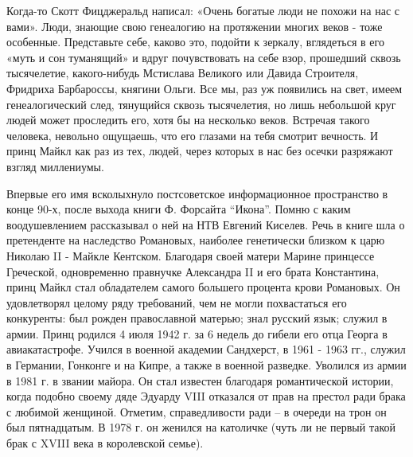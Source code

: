 \raggedcolumns
\begin{multicols}{2} %
\setlength{\parindent}{0pt}



\end{multicols} %

Когда-то Скотт Фицджеральд написал:  «Очень богатые люди не похожи на нас с
вами». Люди, знающие свою генеалогию на протяжении многих веков - тоже
особенные. Представьте себе, каково это, подойти к зеркалу, вглядеться в его
«муть и сон туманящий» и вдруг почувствовать на себе взор, прошедший сквозь
тысячелетие, какого-нибудь Мстислава Великого или Давида Строителя, Фридриха
Барбароссы, княгини Ольги. Все мы, раз уж появились на свет, имеем
генеалогический след, тянущийся сквозь тысячелетия, но лишь небольшой круг
людей может проследить его, хотя бы на несколько веков. Встречая такого
человека, невольно ощущаешь, что его глазами на тебя смотрит вечность. И принц
Майкл как раз из тех, людей, через которых в нас без осечки разряжают взгляд
миллениумы.

Впервые его имя всколыхнуло постсоветское информационное пространство в конце
90-х, после выхода книги Ф. Форсайта \enquote{Икона}. Помню с каким воодушевлением
рассказывал о ней на НТВ Евгений Киселев. Речь в книге шла о претенденте на
наследство Романовых, наиболее генетически близком к царю Николаю II - Майкле
Кентском. Благодаря своей матери Марине принцессе Греческой, одновременно
правнучке Александра II и его брата Константина, принц Майкл стал обладателем
самого большего процента крови Романовых. Он удовлетворял целому ряду
требований, чем не могли похвастаться его конкуренты: был рожден православной
матерью; знал русский язык; служил в армии. Принц родился 4 июля 1942 г. за 6
недель до гибели его отца Георга в авиакатастрофе. Учился в военной академии
Сандхерст, в 1961 - 1963 гг., служил в Германии, Гонконге и на Кипре, а также в
военной разведке. Уволился из армии в 1981 г. в звании майора. Он стал известен
благодаря романтической истории, когда подобно своему дяде Эдуарду VIII
отказался от прав на престол ради брака с любимой женщиной. Отметим,
справедливости ради – в очереди на трон он был пятнадцатым. В 1978 г. он
женился на католичке (чуть ли не первый такой брак с XVIII века в королевской
семье).

